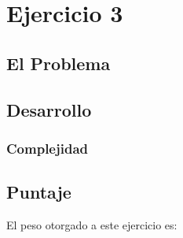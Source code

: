 \section{Ejercicio 3}
\subsection{El Problema}

\subsection{Desarrollo}

\subsubsection{Complejidad}

\subsection{Puntaje}
El peso otorgado a este ejercicio es:
